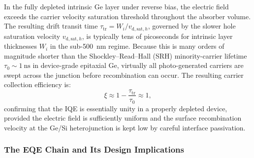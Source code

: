 In the fully depleted intrinsic Ge layer under reverse bias, the electric field
exceeds the carrier velocity saturation threshold throughout the absorber volume.
The resulting drift transit time $\tau_{\mathrm{tr}} = W_i / v_{\mathrm{d,sat},h}$,
governed by the slower hole saturation velocity $v_{\mathrm{d,sat},h}$, is
typically tens of picoseconds for intrinsic layer thicknesses $W_i$ in the
sub-\SI{500}{\nano\metre} regime. Because this is many orders of magnitude
shorter than the Shockley--Read--Hall (SRH) minority-carrier lifetime
$\tau_0 \sim \SI{1}{\nano\second}$ in device-grade epitaxial Ge, virtually all
photo-generated carriers are swept across the junction before recombination can
occur. The resulting carrier collection efficiency is:
\begin{equation}
    \xi \approx 1 - \frac{\tau_{\mathrm{tr}}}{\tau_0} \approx 1,
    \label{eq:collection_eff}
\end{equation}
confirming that the IQE is essentially unity in a properly depleted device,
provided the electric field is sufficiently uniform and the surface recombination
velocity at the Ge/Si heterojunction is kept low by careful interface
passivation.

\subsubsection{The EQE Chain and Its Design Implications}

